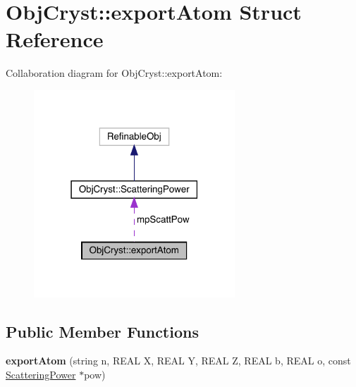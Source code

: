 \hypertarget{struct_obj_cryst_1_1export_atom}{}\section{Obj\+Cryst\+::export\+Atom Struct Reference}
\label{struct_obj_cryst_1_1export_atom}


Collaboration diagram for Obj\+Cryst\+::export\+Atom\+:
\nopagebreak
\begin{figure}[H]
\begin{center}
\leavevmode
\includegraphics[width=214pt]{struct_obj_cryst_1_1export_atom__coll__graph}
\end{center}
\end{figure}
\subsection*{Public Member Functions}
\begin{DoxyCompactItemize}
\item 
\mbox{\label{struct_obj_cryst_1_1export_atom_acb6c0da2a47ff8e24ab6315c9bbd782f}} 
{\bfseries export\+Atom} (string n, R\+E\+AL X, R\+E\+AL Y, R\+E\+AL Z, R\+E\+AL b, R\+E\+AL o, const \mbox{\hyperlink{class_obj_cryst_1_1_scattering_power}{Scattering\+Power}} $\ast$pow)
\end{DoxyCompactItemize}
